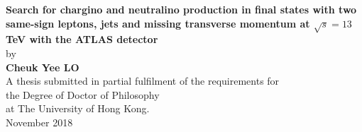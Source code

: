 {}

\begin{center}
    \large
        \hfill
        \vfill
    \begingroup
\huge\textbf{Search for chargino and neutralino production in final states with two same-sign leptons, jets and missing transverse momentum at $\sqrt{s} = 13$ TeV with the ATLAS detector} \\
        \bigskip
    \endgroup
    by\\
    \bigskip
    \Large\textbf{Cheuk Yee LO}\\
    \vfill
    \vfill
    \vfill
{\normalsize
A thesis submitted in partial fulfilment of the requirements for\\
the Degree of Doctor of Philosophy\\
at The University of Hong Kong.\\
    \bigskip
November 2018}
    \vfill
\end{center}
